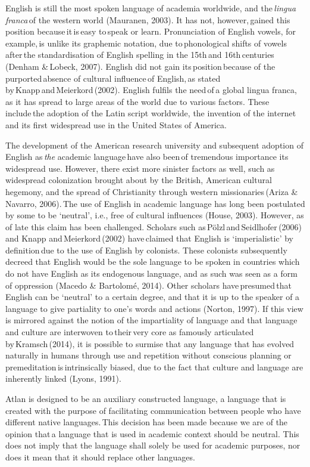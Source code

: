 English is still the most spoken language of academia worldwide, and the \textit{lingua franca} of the western world (Mauranen, 2003). It has not, however, gained this position because it is easy to speak or learn. Pronunciation of English vowels, for example, is unlike its graphemic notation, due to phonological shifts of vowels after the standardisation of English spelling in the 15th and 16th centuries (Denham & Lobeck, 2007). English did not gain its position because of the purported absence of cultural influence of English, as stated by Knapp and Meierkord (2002). English fulfils the need of a global lingua franca, as it has spread to large areas of the world due to various factors. These include the adoption of the Latin script worldwide, the invention of the internet and its first widespread use in the United States of America. 

The development of the American research university and subsequent adoption of English as \textit{the} academic language have also been of tremendous importance its widespread use. However, there exist more sinister factors as well, such as widespread colonization brought about by the British, American cultural hegemony, and the spread of Christianity through western missionaries (Ariza & Navarro, 2006). The use of English in academic language has long been postulated by some to be ‘neutral’, i.e., free of cultural influences (House, 2003). However, as of late this claim has been challenged. Scholars such as Pölzl and Seidlhofer (2006) and Knapp and Meierkord (2002) have claimed that English is ‘imperialistic’ by definition due to the use of English by colonists. These colonists subsequently decreed that English would be the sole language to be spoken in countries which do not have English as its endogenous language, and as such was seen as a form of oppression (Macedo & Bartolomé, 2014). Other scholars have presumed that English can be ‘neutral’ to a certain degree, and that it is up to the speaker of a language to give partiality to one’s words and actions (Norton, 1997). If this view is mirrored against the notion of the impartiality of language and that language and culture are interwoven to their very core as famously articulated by Kramsch (2014), it is possible to surmise that any language that has evolved naturally in humans through use and repetition without conscious planning or premeditation is intrinsically biased, due to the fact that culture and language are inherently linked (Lyons, 1991). 

Atlan is designed to be an auxiliary constructed language, a language that is created with the purpose of facilitating communication between people who have different native languages. This decision has been made because we are of the opinion that a language that is used in academic context should be neutral. This does not imply that the language shall solely be used for academic purposes, nor does it mean that it should replace other languages. 

